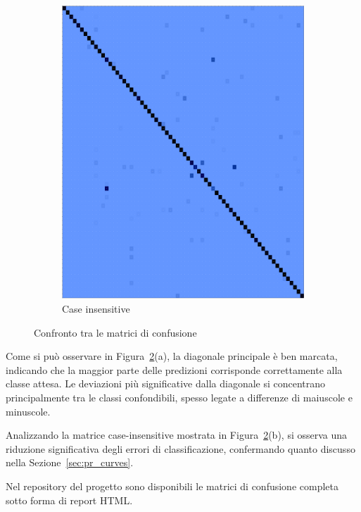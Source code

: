 \begin{figure}[htbp]
\begin{subfigure}[t]{0.25\textwidth}
        \includegraphics[width=\textwidth]{images/confusion_matrix_case.png}
        \caption{Case insensitive}
        \label{fig:confusion_matrix_case_insensitive}
    \end{subfigure}
    \caption{Confronto tra le matrici di confusione}
    \label{fig:confusion_matrices_comparison}
\end{figure}
\FloatBarrier

Come si può osservare in Figura~\ref{fig:confusion_matrices_comparison}(a), la diagonale principale è ben marcata, indicando che la maggior parte delle predizioni corrisponde correttamente alla classe attesa. Le deviazioni più significative dalla diagonale si concentrano principalmente tra le classi confondibili, spesso legate a differenze di maiuscole e minuscole.

Analizzando la matrice case-insensitive mostrata in Figura~\ref{fig:confusion_matrices_comparison}(b), si osserva una riduzione significativa degli errori di classificazione, confermando quanto discusso nella Sezione~\ref{sec:pr_curves}.


Nel repository del progetto sono disponibili le matrici di confusione completa sotto forma di report HTML.

